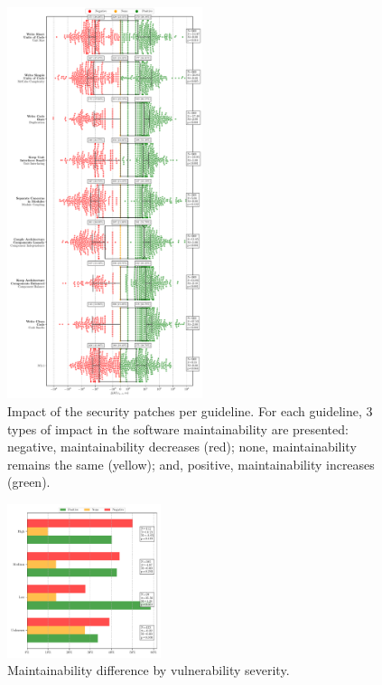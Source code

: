 \documentclass[smallextended]{svjour3}       %
\begin{document}
 \begin{figure}[htp]
     \begin{adjustwidth}{-1cm}{-1cm}  
  	\centering
  	\includegraphics[width=0.51\textwidth]{figures/main_per_guideline.pdf}
    \end{adjustwidth}
	
  	\caption{Impact of the security patches per guideline. For each guideline, $3$ types of impact 
	in the software maintainability are presented: negative, maintainability decreases (red); none, 
	maintainability remains the same (yellow); and, positive, maintainability increases (green).}
 	\label{fig:guidelines}	
 \end{figure}
 
 \begin{figure}[htp]
  	\centering 	
 	\includegraphics[width=0.4\textwidth]{figures/main_per_severity.pdf}
  	\caption{Maintainability difference by vulnerability severity.}
 	\label{fig:severity}
 \end{figure}
\end{document}
